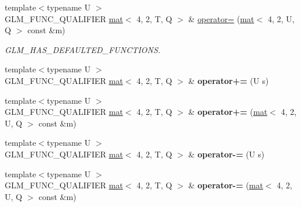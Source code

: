 \begin{DoxyCompactItemize}
{\footnotesize template$<$typename U $>$ }\\G\+L\+M\+\_\+\+F\+U\+N\+C\+\_\+\+Q\+U\+A\+L\+I\+F\+I\+ER \hyperlink{structglm_1_1mat}{mat}$<$ 4, 2, T, Q $>$ \& \hyperlink{structglm_1_1mat_3_014_00_012_00_01T_00_01Q_01_4_a356eb3112895d93e5689f5f489bc0c94}{operator=} (\hyperlink{structglm_1_1mat}{mat}$<$ 4, 2, U, Q $>$ const \&m)
\begin{DoxyCompactList}\small\item\em G\+L\+M\+\_\+\+H\+A\+S\+\_\+\+D\+E\+F\+A\+U\+L\+T\+E\+D\+\_\+\+F\+U\+N\+C\+T\+I\+O\+NS. \end{DoxyCompactList}\item 
\mbox{\label{structglm_1_1mat_3_014_00_012_00_01T_00_01Q_01_4_adbbf9501dbbf80e25bb46facadfbc924}} 
{\footnotesize template$<$typename U $>$ }\\G\+L\+M\+\_\+\+F\+U\+N\+C\+\_\+\+Q\+U\+A\+L\+I\+F\+I\+ER \hyperlink{structglm_1_1mat}{mat}$<$ 4, 2, T, Q $>$ \& {\bfseries operator+=} (U s)
\item 
\mbox{\label{structglm_1_1mat_3_014_00_012_00_01T_00_01Q_01_4_a3a85d5dbf4a5202ffc6ddaeb8e8d557e}} 
{\footnotesize template$<$typename U $>$ }\\G\+L\+M\+\_\+\+F\+U\+N\+C\+\_\+\+Q\+U\+A\+L\+I\+F\+I\+ER \hyperlink{structglm_1_1mat}{mat}$<$ 4, 2, T, Q $>$ \& {\bfseries operator+=} (\hyperlink{structglm_1_1mat}{mat}$<$ 4, 2, U, Q $>$ const \&m)
\item 
\mbox{\label{structglm_1_1mat_3_014_00_012_00_01T_00_01Q_01_4_ab0e7145b2fcb5576fe85581a2d6c0253}} 
{\footnotesize template$<$typename U $>$ }\\G\+L\+M\+\_\+\+F\+U\+N\+C\+\_\+\+Q\+U\+A\+L\+I\+F\+I\+ER \hyperlink{structglm_1_1mat}{mat}$<$ 4, 2, T, Q $>$ \& {\bfseries operator-\/=} (U s)
\item 
\mbox{\label{structglm_1_1mat_3_014_00_012_00_01T_00_01Q_01_4_abc0aa02f1c9179e82a6f41e59370f971}} 
{\footnotesize template$<$typename U $>$ }\\G\+L\+M\+\_\+\+F\+U\+N\+C\+\_\+\+Q\+U\+A\+L\+I\+F\+I\+ER \hyperlink{structglm_1_1mat}{mat}$<$ 4, 2, T, Q $>$ \& {\bfseries operator-\/=} (\hyperlink{structglm_1_1mat}{mat}$<$ 4, 2, U, Q $>$ const \&m)

\end{DoxyCompactItemize}
